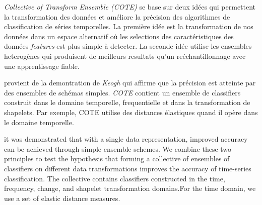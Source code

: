 {\em Collective of Transform Ensemble (COTE)} se base sur deux id\'ees qui permettent la transformation des donn\'ees et am\'eliore la pr\'ecision des algorithmes de classification de s\'eries temporelles. La premi\`ere id\'ee est la transformation de nos donn\'ees dans un espace alternatif  o\`u les selections des caract\'eristiques des donn\'ees {\em features} est plus simple \`a detecter. La seconde id\'ee utilise les ensembles heterog\`enes qui produisent de meilleurs resultats qu'un re\'echantillonnage avec une apprentissage fiable.

provient de la demontration de {\em Keogh} \cite{} qui affirme que la pr\'ecision est atteinte par des ensembles de sch\'emas simples.  
{\em COTE} contient un ensemble de classifiers construit dans le domaine temporelle, frequentielle et dans la transformation de shapelets. Par exemple, COTE utilise des distances \'elastiques quand il op\`ere dans le domaine temporelle. 

it was demonstrated that with a single data representation, improved accuracy can be achieved through simple ensemble schemes. We combine these two principles to test the hypothesis that forming a collective of ensembles of classifiers on different data transformations improves the accuracy of time-series classification. The collective contains classifiers constructed in the time, frequency, change, and shapelet transformation domains.For the time domain, we use a set of elastic distance measures.